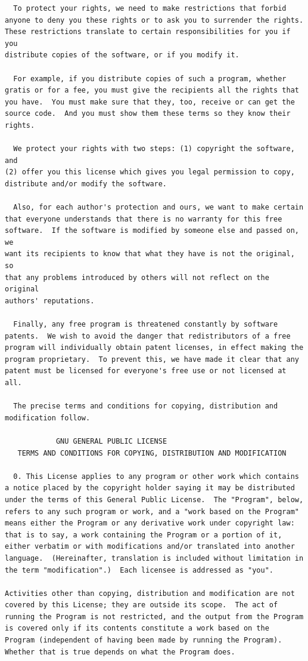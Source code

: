 \documentclass[mingoth,a4paper]{jsarticle}
\begin{document}
{{{{{{\begin{multicols}{2}
\begin{fontsize}{6}{6}
\begin{verbatim}
  To protect your rights, we need to make restrictions that forbid
anyone to deny you these rights or to ask you to surrender the rights.
These restrictions translate to certain responsibilities for you if you
distribute copies of the software, or if you modify it.

  For example, if you distribute copies of such a program, whether
gratis or for a fee, you must give the recipients all the rights that
you have.  You must make sure that they, too, receive or can get the
source code.  And you must show them these terms so they know their
rights.

  We protect your rights with two steps: (1) copyright the software, and
(2) offer you this license which gives you legal permission to copy,
distribute and/or modify the software.

  Also, for each author's protection and ours, we want to make certain
that everyone understands that there is no warranty for this free
software.  If the software is modified by someone else and passed on, we
want its recipients to know that what they have is not the original, so
that any problems introduced by others will not reflect on the original
authors' reputations.

  Finally, any free program is threatened constantly by software
patents.  We wish to avoid the danger that redistributors of a free
program will individually obtain patent licenses, in effect making the
program proprietary.  To prevent this, we have made it clear that any
patent must be licensed for everyone's free use or not licensed at all.

  The precise terms and conditions for copying, distribution and
modification follow.

            GNU GENERAL PUBLIC LICENSE
   TERMS AND CONDITIONS FOR COPYING, DISTRIBUTION AND MODIFICATION

  0. This License applies to any program or other work which contains
a notice placed by the copyright holder saying it may be distributed
under the terms of this General Public License.  The "Program", below,
refers to any such program or work, and a "work based on the Program"
means either the Program or any derivative work under copyright law:
that is to say, a work containing the Program or a portion of it,
either verbatim or with modifications and/or translated into another
language.  (Hereinafter, translation is included without limitation in
the term "modification".)  Each licensee is addressed as "you".

Activities other than copying, distribution and modification are not
covered by this License; they are outside its scope.  The act of
running the Program is not restricted, and the output from the Program
is covered only if its contents constitute a work based on the
Program (independent of having been made by running the Program).
Whether that is true depends on what the Program does.


\end{verbatim}
\end{fontsize}
\end{multicols}}}}}}}
\end{document}
